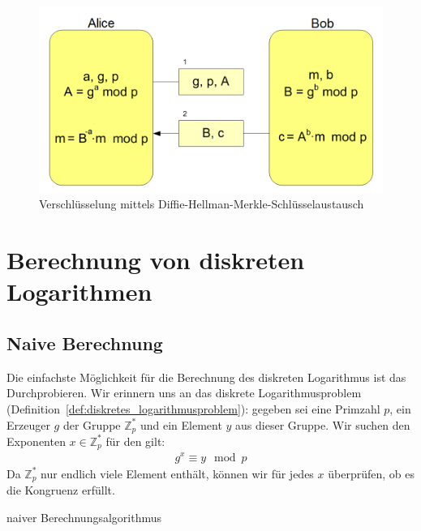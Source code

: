 \documentclass[
  a4paper,
  11pt,
]{scrartcl}
\theoremstyle{plain}
\theoremstyle{definition}
\theoremstyle{remark}
\newcommand{\Z}{\mathbb{Z}}
\renewcommand{\P}{\mathbb{P}}
\begin{document}
\begin{figure}[H]\label{fig:enc_with_dhke}
  \centering
  \includegraphics[width=\textwidth]{DHKE_enc.png}
  \caption{Verschlüsselung mittels Diffie-Hellman-Merkle-Schlüsselaustausch}
\end{figure}

\section{Berechnung von diskreten Logarithmen}
\label{sec:berechnung_von_diskreten_logarithmen}

\subsection{Naive Berechnung}
\label{sub:naive_berechnung}

Die einfachste Möglichkeit für die Berechnung des diskreten Logarithmus ist das
Durchprobieren. Wir erinnern uns an das diskrete Logarithmusproblem
(Definition~\ref{def:diskretes_logarithmusproblem}): gegeben sei eine Primzahl
$p$, ein Erzeuger $g$ der Gruppe $\Z_p^*$ und ein Element $y$ aus dieser Gruppe.
Wir suchen den Exponenten $x \in \Z_p^*$ für den gilt:
\begin{align*}
  g^x \equiv y \mod p
\end{align*}
Da $\Z_p^*$ nur endlich viele Element enthält, können wir für jedes $x$
überprüfen, ob es die Kongruenz erfüllt.

\begin{algorithm}[H]\label{alg:dlog_naive}
  \caption{naiver Berechnungsalgorithmus}
  \begin{algorithmic}
    \REQUIRE{$p \in \P, \left\langle g \right\rangle \in \Z_p^*, y \in \Z_p^*$}
      \ELSE{}
      \ENDIF{}
    \ENDFOR{}
  \end{algorithmic}
\end{algorithm}
\end{document}
